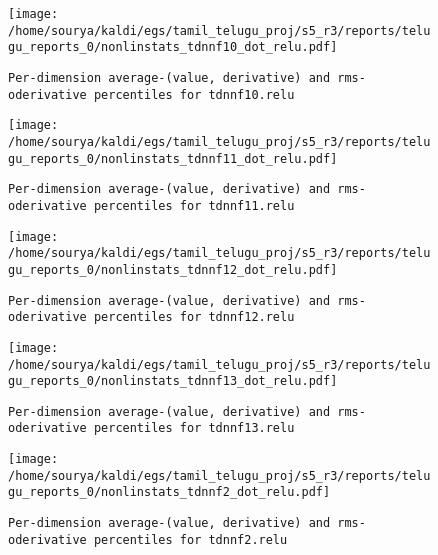 \documentclass[prl,10pt,twocolumn]{revtex4}
\begin{document}
\newpage
\begin{figure}[h]
  \begin{center}
    \caption{\texttt{Per-dimension average-(value, derivative) and rms-oderivative percentiles for tdnnf10.relu}}
    \texttt{[image: /home/sourya/kaldi/egs/tamil\_telugu\_proj/s5\_r3/reports/telugu\_reports\_0/nonlinstats\_tdnnf10\_dot\_relu.pdf]}
  \end{center}
\end{figure}
\clearpage


\newpage
\begin{figure}[h]
  \begin{center}
    \caption{\texttt{Per-dimension average-(value, derivative) and rms-oderivative percentiles for tdnnf11.relu}}
    \texttt{[image: /home/sourya/kaldi/egs/tamil\_telugu\_proj/s5\_r3/reports/telugu\_reports\_0/nonlinstats\_tdnnf11\_dot\_relu.pdf]}
  \end{center}
\end{figure}
\clearpage


\newpage
\begin{figure}[h]
  \begin{center}
    \caption{\texttt{Per-dimension average-(value, derivative) and rms-oderivative percentiles for tdnnf12.relu}}
    \texttt{[image: /home/sourya/kaldi/egs/tamil\_telugu\_proj/s5\_r3/reports/telugu\_reports\_0/nonlinstats\_tdnnf12\_dot\_relu.pdf]}
  \end{center}
\end{figure}
\clearpage


\newpage
\begin{figure}[h]
  \begin{center}
    \caption{\texttt{Per-dimension average-(value, derivative) and rms-oderivative percentiles for tdnnf13.relu}}
    \texttt{[image: /home/sourya/kaldi/egs/tamil\_telugu\_proj/s5\_r3/reports/telugu\_reports\_0/nonlinstats\_tdnnf13\_dot\_relu.pdf]}
  \end{center}
\end{figure}
\clearpage


\newpage
\begin{figure}[h]
  \begin{center}
    \caption{\texttt{Per-dimension average-(value, derivative) and rms-oderivative percentiles for tdnnf2.relu}}
    \texttt{[image: /home/sourya/kaldi/egs/tamil\_telugu\_proj/s5\_r3/reports/telugu\_reports\_0/nonlinstats\_tdnnf2\_dot\_relu.pdf]}
  \end{center}
\end{figure}
\clearpage
\end{document}
